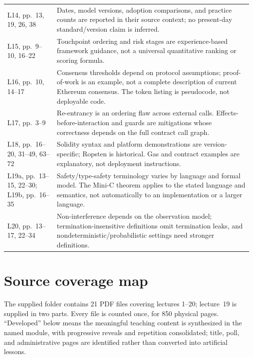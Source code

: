 \documentclass[11pt,a4paper]{article}
\newcommand{\currentmodule}{Contents}
\newcommand{\module}[2]{\par\Needspace{8\baselineskip}\gdef\currentmodule{#1}\section{#1}\label{#2}}
\numberwithin{figure}{section}
\begin{document}
\begin{longtable}{@{}>{\raggedright\arraybackslash}p{26mm}>{\raggedright\arraybackslash}p{123mm}@{}}
L14, pp.~13, 19, 26, 38 & Dates, model versions, adoption comparisons, and practice counts are reported in their source context; no present-day standard/version claim is inferred.\\
L15, pp.~9--10, 16--22 & Touchpoint ordering and risk stages are experience-based framework guidance, not a universal quantitative ranking or scoring formula.\\
L16, pp.~10, 14--17 & Consensus thresholds depend on protocol assumptions; proof-of-work is an example, not a complete description of current Ethereum consensus. The token listing is pseudocode, not deployable code.\\
L17, pp.~3--9 & Re-entrancy is an ordering flaw across external calls. Effects-before-interaction and guards are mitigations whose correctness depends on the full contract call graph.\\
L18, pp.~16--20, 31--49, 63--72 & Solidity syntax and platform demonstrations are version-specific; Ropsten is historical. Gas and contract examples are explanatory, not deployment instructions.\\
L19a, pp.~13--15, 22--30; L19b, pp.~16--35 & Safety/type-safety terminology varies by language and formal model. The Mini-C theorem applies to the stated language and semantics, not automatically to an implementation or a larger language.\\
L20, pp.~13--17, 22--34 & Non-interference depends on the observation model; termination-insensitive definitions omit termination leaks, and nondeterministic/probabilistic settings need stronger definitions.\\\bottomrule
\end{longtable}

\module{Source coverage map}{app:coverage}
The supplied folder contains 21 PDF files covering lectures 1--20; lecture~19 is supplied in two parts. Every file is counted once, for 850 physical pages. ``Developed'' below means the meaningful teaching content is synthesized in the named module, with progressive reveals and repetition consolidated; title, poll, and administrative pages are identified rather than converted into artificial lessons.
\end{document}
